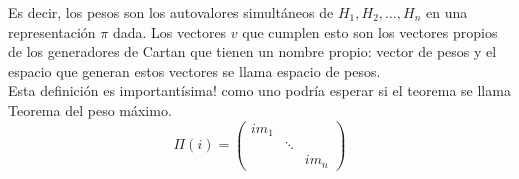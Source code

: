 \documentclass[12pt]{article}
\begin{document}
Es decir, los pesos son los autovalores simultáneos de $H_1, H_2, \dots, H_n$ en una representación $\pi$ dada. Los vectores $v$ que cumplen esto son los vectores propios de los generadores de Cartan que tienen un nombre propio: vector de pesos y el espacio que generan estos vectores se llama espacio de pesos.\\ Esta definición es importantísima! como uno podría esperar si el teorema se llama Teorema del peso máximo.
\begin{equation}
    \Pi(i)= \begin{pmatrix}
        im_1 & &  \\
        & \ddots &   \\
        & & im_n
    \end{pmatrix}
\end{equation}
\end{document}
